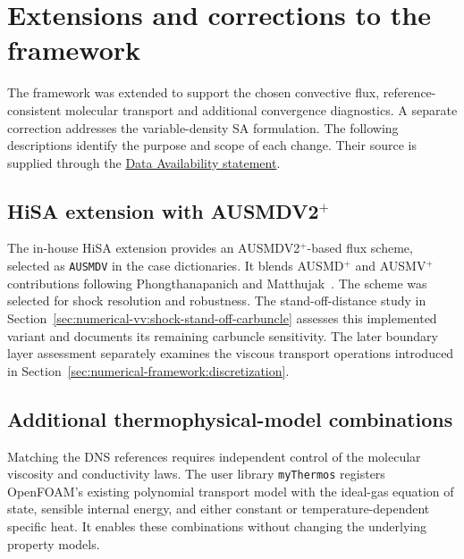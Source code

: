 \section{Extensions and corrections to the framework}
\label{sec:numerical-framework:extensions}

The framework was extended to support the chosen convective flux,
reference-consistent molecular transport and additional convergence
diagnostics. A separate correction addresses the variable-density SA
formulation. The following descriptions identify the purpose and scope of
each change. Their source is supplied through the
\hyperref[chap:data-avail]{Data Availability statement}.

\subsection{HiSA extension with \texorpdfstring{AUSMDV2\(^+\)}{AUSMDV2+}}
\label{subsec:ext:AUSM}

The in-house HiSA extension provides an AUSMDV2\(^+\)-based flux scheme,
selected as \texttt{AUSMDV} in the case dictionaries. It blends AUSMD\(^+\)
and AUSMV\(^+\) contributions following
Phongthanapanich and Matthujak~\cite{PhongthanapanichMatthujak2021AUSMDV2Plus}.
The scheme was selected for shock resolution and robustness. The
stand-off-distance study in
Section~\ref{sec:numerical-vv:shock-stand-off-carbuncle} assesses this
implemented variant and documents its remaining carbuncle sensitivity.
The later boundary layer assessment separately examines the viscous
transport operations introduced in
Section~\ref{sec:numerical-framework:discretization}.

\subsection{Additional thermophysical-model combinations}
\label{subsec:ext:thermo-physical-extension}

Matching the DNS references requires independent control of the molecular
viscosity and conductivity laws. The user library \texttt{myThermos}
registers OpenFOAM's existing polynomial transport model with the ideal-gas
equation of state, sensible internal energy, and either constant or
temperature-dependent specific heat. It enables these combinations without
changing the underlying property models.
\par\medskip

